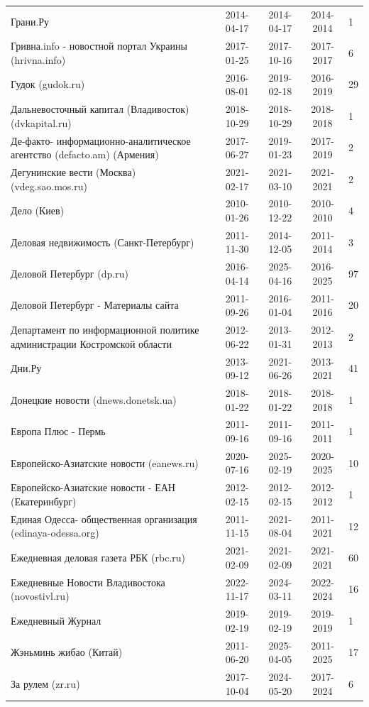 \begin{longtable}{p{6cm}cccp{2cm}}
Грани.Ру & 2014-04-17 & 2014-04-17 & 2014-2014 & 1\\
Гривна.info - новостной портал Украины (hrivna.info) & 2017-01-25 & 2017-10-16 & 2017-2017 & 6\\
Гудок (gudok.ru) & 2016-08-01 & 2019-02-18 & 2016-2019 & 29\\
Дальневосточный капитал (Владивосток) (dvkapital.ru) & 2018-10-29 & 2018-10-29 & 2018-2018 & 1\\
Де-факто- информационно-аналитическое агентство (defacto.am) (Армения) & 2017-06-27 & 2019-01-23 & 2017-2019 & 2\\
Дегунинские вести (Москва) (vdeg.sao.mos.ru) & 2021-02-17 & 2021-03-10 & 2021-2021 & 2\\
Дело (Киев) & 2010-01-26 & 2010-12-22 & 2010-2010 & 4\\
Деловая недвижимость (Санкт-Петербург) & 2011-11-30 & 2014-12-05 & 2011-2014 & 3\\
Деловой Петербург (dp.ru) & 2016-04-14 & 2025-04-16 & 2016-2025 & 97\\
Деловой Петербург - Материалы сайта & 2011-09-26 & 2016-01-04 & 2011-2016 & 20\\
Департамент по информационной политике администрации Костромской области & 2012-06-22 & 2013-01-31 & 2012-2013 & 2\\
Дни.Ру & 2013-09-12 & 2021-06-26 & 2013-2021 & 41\\
Донецкие новости (dnews.donetsk.ua) & 2018-01-22 & 2018-01-22 & 2018-2018 & 1\\
Европа Плюс - Пермь & 2011-09-16 & 2011-09-16 & 2011-2011 & 1\\
Европейско-Азиатские новости (eanews.ru) & 2020-07-16 & 2025-02-19 & 2020-2025 & 10\\
Европейско-Азиатские новости - ЕАН (Екатеринбург) & 2012-02-15 & 2012-02-15 & 2012-2012 & 1\\
Единая Одесса- общественная организация (edinaya-odessa.org) & 2011-11-15 & 2021-08-04 & 2011-2021 & 12\\
Ежедневная деловая газета РБК (rbc.ru) & 2021-02-09 & 2021-02-09 & 2021-2021 & 60\\
Ежедневные Новости Владивостока (novostivl.ru) & 2022-11-17 & 2024-03-11 & 2022-2024 & 16\\
Ежедневный Журнал & 2019-02-19 & 2019-02-19 & 2019-2019 & 1\\
Жэньминь жибао (Китай) & 2011-06-20 & 2025-04-05 & 2011-2025 & 17\\
За рулем (zr.ru) & 2017-10-04 & 2024-05-20 & 2017-2024 & 6\\

\end{longtable}
